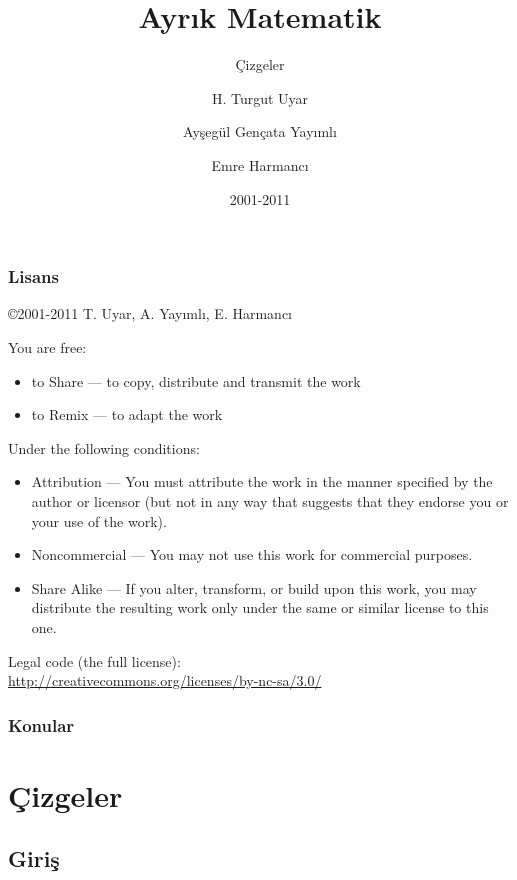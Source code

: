 \documentclass[dvipsnames]{beamer}
\title{Ayrık Matematik}
\subtitle{Çizgeler}
\author{H. Turgut Uyar \and Ayşegül Gençata Yayımlı \and Emre Harmancı}
\date{2001-2011}
\theoremstyle{definition}
\theoremstyle{example}
\theoremstyle{plain}
\begin{document}
\begin{frame}
  \titlepage
\end{frame}

\begin{frame}
  \frametitle{Lisans}

  \hfill
  \copyright 2001-2011 T. Uyar, A. Yayımlı, E. Harmancı

  \vfill
  \begin{tiny}
    You are free:
    \begin{itemize}
      \item to Share — to copy, distribute and transmit the work
      \item to Remix — to adapt the work
    \end{itemize}

    Under the following conditions:
    \begin{itemize}
      \item Attribution — You must attribute the work in the manner specified by
        the author or licensor (but not in any way that suggests that they
        endorse you or your use of the work).

      \item Noncommercial — You may not use this work for commercial purposes.

      \item Share Alike — If you alter, transform, or build upon this work, you
        may distribute the resulting work only under the same or similar license
        to this one.
    \end{itemize}
  \end{tiny}

  \vfill
  Legal code (the full license):\\
  \url{http://creativecommons.org/licenses/by-nc-sa/3.0/}
\end{frame}

\begin{frame}
  \frametitle{Konular}
  \tableofcontents
\end{frame}

\section{Çizgeler}

\subsection{Giriş}
\end{document}
